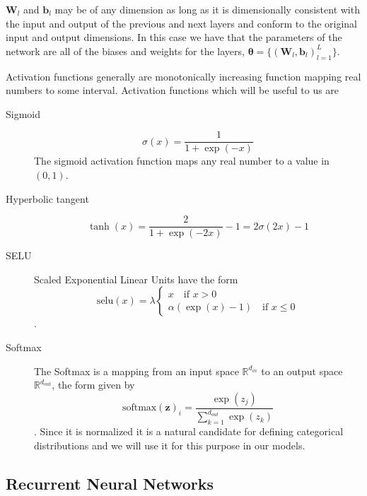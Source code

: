 $\bm{W}_l$ and $\bm{b}_l$ may be of any dimension as long as it is dimensionally consistent
with the input and output of the previous and next layers and conform to the
original input and output dimensions. In this case we have that the parameters
of the network are all of the biases and weights for the layers, $\bm{\theta} =
\{(\bm{W}_l, \bm{b}_l)_{l = 1}^L\}$.

Activation functions generally are monotonically increasing function mapping real
numbers to some interval. Activation functions which will be useful to us are
\begin{description}
\item[Sigmoid]
  \begin{equation}
    \label{eq:sigmoid}
    \sigma(x) = \frac{1}{1 + \exp(-x)}
  \end{equation}
  The sigmoid activation function maps any real number to a value in $(0, 1)$.
\item[Hyperbolic tangent]
  \begin{equation}
    \label{eq:tanh}
    \tanh(x) = \frac{2}{1 + \exp(-2x)} - 1 = 2 \sigma(2x) - 1
  \end{equation}
\item[SELU]
  Scaled Exponential Linear Units have the form
  \begin{equation}
    \label{eq:SELU}
    \text{selu}(x) = \lambda
    \begin{cases}
      x \quad\text{if $x > 0$} \\
      \alpha(\exp(x) - 1) \quad \text{if $x \leq 0$}
    \end{cases}
  \end{equation} \cite{DBLP:journals/corr/KlambauerUMH17}.
\item[Softmax]
  The Softmax is a mapping from an input space $\mathbb{R}^{d_{in}}$ to an output
  space $\mathbb{R}^{d_{out}}$, the form given by
  \begin{equation}
    \label{eq:softmax}
    \text{softmax}(\bm{z})_i = \frac{\exp(z_j)}{\sum_{k=1}^{d_{out}}\exp(z_k)}
  \end{equation}.
  Since it is normalized it is a natural candidate for defining categorical
  distributions \cite{Barber:2012:BRM:2207809} and we will use it for this
  purpose in our models.
\end{description}

\subsection{Recurrent Neural Networks}

